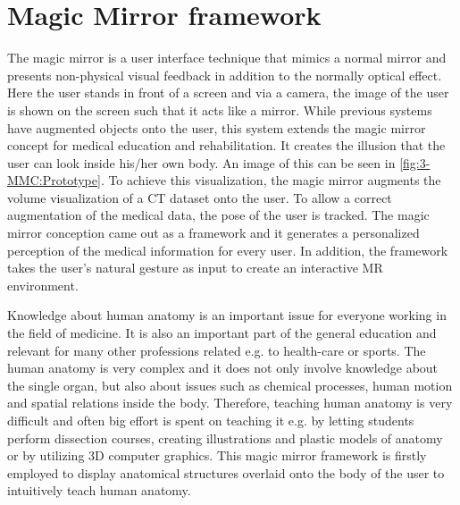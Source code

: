 \section{Magic Mirror framework} \label{sec:3-PPMM:MMC}
The magic mirror \cite{Grosjean1999} is a user interface technique that mimics a normal mirror and presents non-physical visual feedback in addition to the normally optical effect. Here the user stands in front of a screen and via a camera, the image of the user is shown on the screen such that it acts like a mirror. 
While previous systems have augmented objects onto the user, this system extends the magic mirror concept for medical education and rehabilitation. It creates the illusion that the user can look inside his/her own body. An image of this can be seen in \figurename{\ref{fig:3-MMC:Prototype}}. To achieve this visualization, the magic mirror augments the volume visualization of a CT dataset onto the user. 
To allow a correct augmentation of the medical data, the pose of the user is tracked. The magic mirror conception came out as a framework and it generates a personalized perception of the medical information for every user. In addition, the framework takes the user's natural gesture as input to create an interactive MR environment. 

Knowledge about human anatomy is an important issue for everyone working in the field of medicine. 
It is also an important part of the general education and relevant for many other professions related e.g. to health-care or sports. The human anatomy is very complex and it does not only involve knowledge about the single organ, but also about issues such as chemical processes, human motion and spatial relations inside the body. Therefore, teaching human anatomy is very difficult and often big effort is spent on teaching it e.g. by letting students perform dissection courses, creating illustrations and plastic models of anatomy or by utilizing 3D computer graphics.
This magic mirror framework is firstly employed to display anatomical structures overlaid onto the body of the user to intuitively teach human anatomy. 

